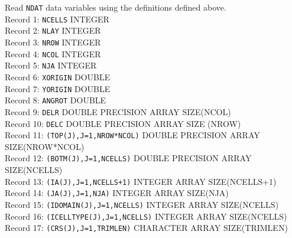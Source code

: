 \vspace{5mm}
\noindent Read \texttt{NDAT} data variables using the definitions defined above. \\
\noindent Record 1: \texttt{NCELLS} {\color{red} \footnotesize{INTEGER}} \\
\noindent Record 2: \texttt{NLAY} {\color{red} \footnotesize{INTEGER}} \\
\noindent Record 3: \texttt{NROW} {\color{red} \footnotesize{INTEGER}} \\
\noindent Record 4: \texttt{NCOL} {\color{red} \footnotesize{INTEGER}} \\
\noindent Record 5: \texttt{NJA} {\color{red} \footnotesize{INTEGER}} \\
\noindent Record 6: \texttt{XORIGIN} {\color{red} \footnotesize{DOUBLE}} \\
\noindent Record 7: \texttt{YORIGIN} {\color{red} \footnotesize{DOUBLE}} \\
\noindent Record 8: \texttt{ANGROT} {\color{red} \footnotesize{DOUBLE}} \\
\noindent Record 9: \texttt{DELR} {\color{red} \footnotesize{DOUBLE PRECISION ARRAY SIZE(NCOL)}} \\
\noindent Record 10: \texttt{DELC} {\color{red} \footnotesize{DOUBLE PRECISION ARRAY SIZE (NROW)}} \\
\noindent Record 11: \texttt{(TOP(J),J=1,NROW*NCOL)} {\color{red} \footnotesize{DOUBLE PRECISION ARRAY SIZE(NROW*NCOL)}} \\
\noindent Record 12: \texttt{(BOTM(J),J=1,NCELLS)} {\color{red} \footnotesize{DOUBLE PRECISION ARRAY SIZE(NCELLS)}} \\
\noindent Record 13: \texttt{(IA(J),J=1,NCELLS+1)} {\color{red} \footnotesize{INTEGER ARRAY SIZE(NCELLS+1)}} \\
\noindent Record 14: \texttt{(JA(J),J=1,NJA)} {\color{red} \footnotesize{INTEGER ARRAY SIZE(NJA)}} \\
\noindent Record 15: \texttt{(IDOMAIN(J),J=1,NCELLS)} {\color{red} \footnotesize{INTEGER ARRAY SIZE(NCELLS)}} \\
\noindent Record 16: \texttt{(ICELLTYPE(J),J=1,NCELLS)} {\color{red} \footnotesize{INTEGER ARRAY SIZE(NCELLS)}} \\
\noindent Record 17: \texttt{(CRS(J),J=1,TRIMLEN)} {\color{red} \footnotesize{CHARACTER ARRAY SIZE(TRIMLEN)}} \\

\newpage
